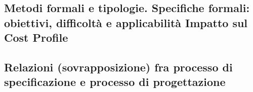 \subsection{Metodi formali e tipologie. Specifiche formali: obiettivi, difficoltà e applicabilità Impatto sul Cost Profile}
\subsection{Relazioni (sovrapposizione) fra processo di specificazione e processo di progettazione}